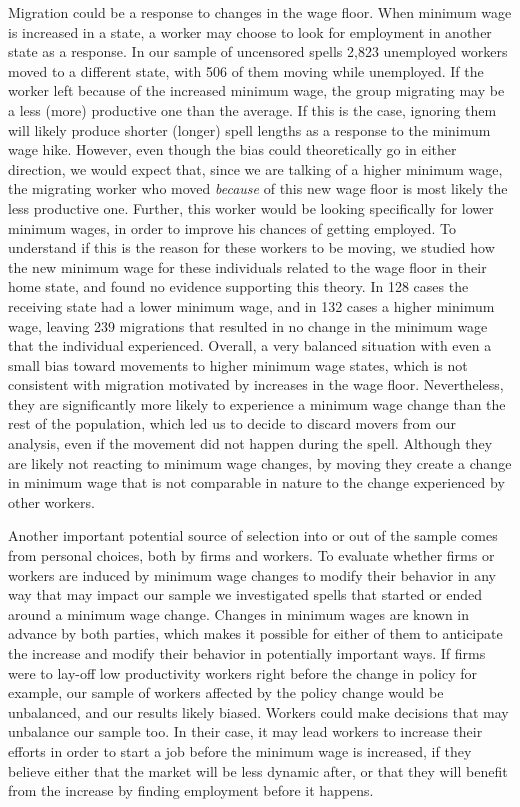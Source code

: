 \documentclass{article}
\begin{document}
Migration could be a response to changes in the wage floor. When minimum wage is increased in a state, a worker may choose to look for employment in another state as a response. In our sample of uncensored spells 2,823 unemployed workers moved to a different state, with 506 of them moving while unemployed. If the worker left because of the increased minimum wage, the group migrating may be a less (more) productive one than the average. If this is the case, ignoring them will likely produce shorter (longer) spell lengths as a response to the minimum wage hike. However, even though the bias could theoretically go in either direction, we would expect that, since we are talking of a higher minimum wage, the migrating worker who moved \textit{because} of this new wage floor is most likely the less productive one. Further, this worker would be looking specifically for lower minimum wages, in order to improve his chances of getting employed. To understand if this is the reason for these workers to be moving, we studied how the new minimum wage for these individuals related to the wage floor in their home state, and found no evidence supporting this theory. In 128 cases the receiving state had a lower minimum wage, and in 132 cases a higher minimum wage, leaving 239 migrations that resulted in no change in the minimum wage that the individual experienced. Overall, a very balanced situation with even a small bias toward movements to higher minimum wage states, which is not consistent with migration motivated by increases in the wage floor. Nevertheless, they are significantly more likely to experience a minimum wage change than the rest of the population, which led us to decide to discard movers from our analysis, even if the movement did not happen during the spell. Although they are likely not reacting to minimum wage changes, by moving they create a change in minimum wage that is not comparable in nature to the change experienced by other workers.

Another important potential source of selection into or out of the sample comes from personal choices, both by firms and workers. To evaluate whether firms or workers are induced by minimum wage changes to modify their behavior in any way that may impact our sample we investigated spells that started or ended around a minimum wage change. Changes in minimum wages are known in advance by both parties, which makes it possible for either of them to anticipate the increase and modify their behavior in potentially important ways. If firms were to lay-off low productivity workers right before the change in policy for example, our sample of workers affected by the policy change would be unbalanced, and our results likely biased. Workers could make decisions that may unbalance our sample too. In their case, it may lead workers to increase their efforts in order to start a job before the minimum wage is increased, if they believe either that the market will be less dynamic after, or that they will benefit from the increase by finding employment before it happens.
\end{document}
